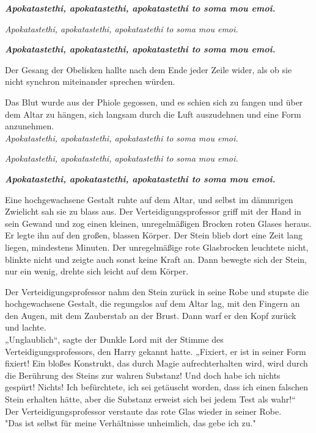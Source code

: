 {\textbf{\emph{\hfill\break Apokatastethi, apokatastethi, apokatastethi to soma mou emoi.}}

\hfill\break

\emph{Apokatastethi, apokatastethi, apokatastethi to soma mou emoi.}

\hfill\break

\textbf{\emph{Apokatastethi, apokatastethi, apokatastethi to soma mou emoi.}}

Der Gesang der Obelisken hallte nach dem Ende jeder Zeile wider, als ob sie nicht synchron miteinander sprechen würden.

Das Blut wurde aus der Phiole gegossen, und es schien sich zu fangen und über dem Altar zu hängen, sich langsam durch die Luft auszudehnen und eine Form anzunehmen.\\

\hfill\break \emph{Apokatastethi, apokatastethi, apokatastethi to soma mou emoi.}

\hfill\break

\emph{Apokatastethi, apokatastethi, apokatastethi to soma mou emoi.}

\hfill\break

\textbf{\emph{Apokatastethi, apokatastethi, apokatastethi to soma mou emoi.}}

Eine hochgewachsene Gestalt ruhte auf dem Altar, und selbst im dämmrigen Zwielicht sah sie zu blass aus. Der Verteidigungsprofessor griff mit der Hand in sein Gewand und zog einen kleinen, unregelmäßigen Brocken roten Glases heraus.\\ Er legte ihn auf den großen, blassen Körper. Der Stein blieb dort eine Zeit lang liegen, mindestens Minuten. Der unregelmäßige rote Glasbrocken leuchtete nicht, blinkte nicht und zeigte auch sonst keine Kraft an. Dann bewegte sich der Stein, nur ein wenig, drehte sich leicht auf dem Körper.

Der Verteidigungsprofessor nahm den Stein zurück in seine Robe und stupste die hochgewachsene Gestalt, die regungslos auf dem Altar lag, mit den Fingern an den Augen, mit dem Zauberstab an der Brust. Dann warf er den Kopf zurück und lachte.\\ „Unglaublich“, sagte der Dunkle Lord mit der Stimme des Verteidigungsprofessors, den Harry gekannt hatte. „Fixiert, er ist in seiner Form fixiert! Ein bloßes Konstrukt, das durch Magie aufrechterhalten wird, wird durch die Berührung des Steins zur wahren Substanz! Und doch habe ich nichts gespürt! Nichts! Ich befürchtete, ich sei getäuscht worden, dass ich einen falschen Stein erhalten hätte, aber die Substanz erweist sich bei jedem Test als wahr!“\\ Der Verteidigungsprofessor verstaute das rote Glas wieder in seiner Robe.\\ "Das ist selbst für meine Verhältnisse unheimlich, das gebe ich zu."

}
